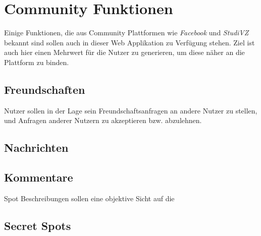 \section{Community Funktionen}

Einige Funktionen, die aus Community Plattformen wie \textit{Facebook}
und \textit{StudiVZ} bekannt sind sollen auch in dieser Web
Applikation zu Verfügung stehen. Ziel ist auch hier einen Mehrwert für
die Nutzer zu generieren, um diese näher an die Plattform zu binden.

\subsection{Freundschaften}
Nutzer sollen in der Lage sein Freundschaftsanfragen an andere Nutzer
zu stellen, und Anfragen anderer Nutzern zu akzeptieren
bzw. abzulehnen.

\subsection{Nachrichten}

\subsection{Kommentare}
\label{subsec:Kommentare}

Spot Beschreibungen sollen eine objektive Sicht auf die


\subsection{Secret Spots}

